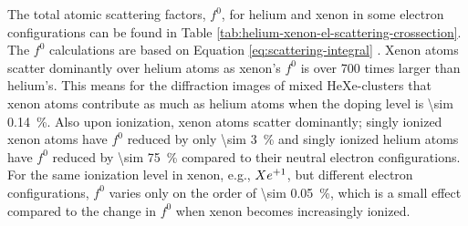 %
The total atomic scattering factors, $f^{0}$, for helium and xenon in some electron configurations can be found in Table \ref{tab:helium-xenon-el-scattering-crossection}. The $f^{0}$ calculations are based on Equation \eqref{eq:scattering-integral} \citep{Ho-2016-PC}. Xenon atoms scatter dominantly over helium atoms as xenon's $f^{0}$ is over \num{700} times larger than helium's. This means for the diffraction images of mixed HeXe-clusters that xenon atoms contribute as much as helium atoms when the doping level is \SI{\sim 0.14}{\percent}. Also upon ionization, xenon atoms scatter dominantly; singly ionized xenon atoms have $f^{0}$ reduced by only \SI{\sim 3}{\percent} and singly ionized helium atoms have $f^{0}$ reduced by \SI{\sim 75}{\percent} compared to their neutral electron configurations. For the same ionization level in xenon, e.g., $Xe\textsuperscript{+1}$, but different electron configurations, $f^{0}$ varies only on the order of \SI{\sim 0.05}{\percent}, which is a small effect compared to the change in $f^{0}$ when xenon becomes increasingly ionized.
%
%
%
